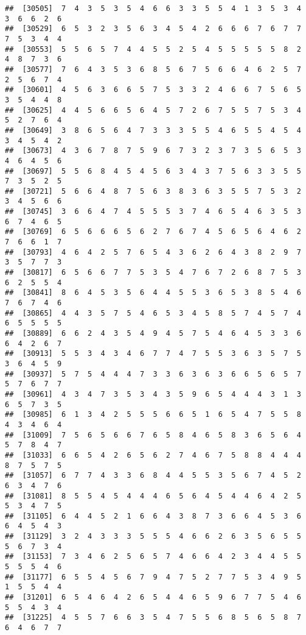 \documentclass[
]{book}
\begin{document}
\begin{verbatim}
##  [30505]  7  4  3  5  3  5  4  6  6  3  3  5  5  4  1  3  5  3  4  3  6  6  2  6
##  [30529]  6  5  3  2  3  5  6  3  4  5  4  2  6  6  6  7  6  7  7  7  5  3  4  4
##  [30553]  5  5  6  5  7  4  4  5  5  2  5  4  5  5  5  5  5  8  2  4  8  7  3  6
##  [30577]  7  6  4  3  5  3  6  8  5  6  7  5  6  6  4  6  2  5  7  2  5  6  7  4
##  [30601]  4  5  6  3  6  6  5  7  5  3  3  2  4  6  6  7  5  6  5  3  5  4  4  8
##  [30625]  4  4  5  6  6  5  6  4  5  7  2  6  7  5  5  7  5  3  4  5  2  7  6  4
##  [30649]  3  8  6  5  6  4  7  3  3  3  5  5  4  6  5  5  4  5  4  3  4  5  4  2
##  [30673]  4  3  6  7  8  7  5  9  6  7  3  2  3  7  3  5  6  5  3  4  6  4  5  6
##  [30697]  5  5  6  8  4  5  4  5  6  3  4  3  7  5  6  3  3  5  5  7  3  5  2  5
##  [30721]  5  6  6  4  8  7  5  6  3  8  3  6  3  5  5  7  5  3  2  3  4  5  6  6
##  [30745]  3  6  6  4  7  4  5  5  5  3  7  4  6  5  4  6  3  5  3  6  7  4  6  5
##  [30769]  6  5  6  6  6  5  6  2  7  6  7  4  5  6  5  6  4  6  2  7  6  6  1  7
##  [30793]  4  6  4  2  5  7  6  5  4  3  6  2  6  4  3  8  2  9  7  3  5  7  7  3
##  [30817]  6  5  6  6  7  7  5  3  5  4  7  6  7  2  6  8  7  5  3  6  2  5  5  4
##  [30841]  8  6  4  5  3  5  6  4  4  5  5  3  6  5  3  8  5  4  6  7  6  7  4  6
##  [30865]  4  4  3  5  7  5  4  6  5  3  4  5  8  5  7  4  5  7  4  6  5  5  5  5
##  [30889]  6  6  2  4  3  5  4  9  4  5  7  5  4  6  4  5  3  3  6  6  4  2  6  7
##  [30913]  5  5  3  4  3  4  6  7  7  4  7  5  5  3  6  3  5  7  5  3  6  4  5  9
##  [30937]  5  7  5  4  4  4  7  3  3  6  3  6  3  6  6  5  6  5  7  5  7  6  7  7
##  [30961]  4  3  4  7  3  5  3  4  3  5  9  6  5  4  4  4  3  1  3  6  5  7  3  5
##  [30985]  6  1  3  4  2  5  5  5  6  6  5  1  6  5  4  7  5  5  8  4  3  4  6  4
##  [31009]  7  5  6  5  6  6  7  6  5  8  4  6  5  8  3  6  5  6  4  5  7  8  4  7
##  [31033]  6  6  5  4  2  6  5  6  2  7  4  6  7  5  8  8  4  4  4  8  7  5  7  5
##  [31057]  6  7  7  4  3  3  6  8  4  4  5  5  3  5  6  7  4  5  2  6  3  4  7  6
##  [31081]  8  5  5  4  5  4  4  4  6  5  6  4  5  4  4  6  4  2  5  5  3  4  7  5
##  [31105]  6  4  4  5  2  1  6  6  4  3  8  7  3  6  6  4  5  3  6  6  4  5  4  3
##  [31129]  3  2  4  3  3  3  5  5  5  4  6  6  2  6  3  5  6  5  5  5  6  7  3  4
##  [31153]  7  3  4  6  2  5  6  5  7  4  6  6  4  2  3  4  4  5  5  5  5  5  4  6
##  [31177]  6  5  5  4  5  6  7  9  4  7  5  2  7  7  5  3  4  9  5  1  5  5  4  4
##  [31201]  6  5  4  6  4  2  6  5  4  4  6  5  9  6  7  7  5  4  6  5  5  4  3  4
##  [31225]  4  5  5  7  6  6  3  5  4  7  5  5  6  8  5  6  5  8  7  6  4  6  7  7

\end{verbatim}
\end{document}
